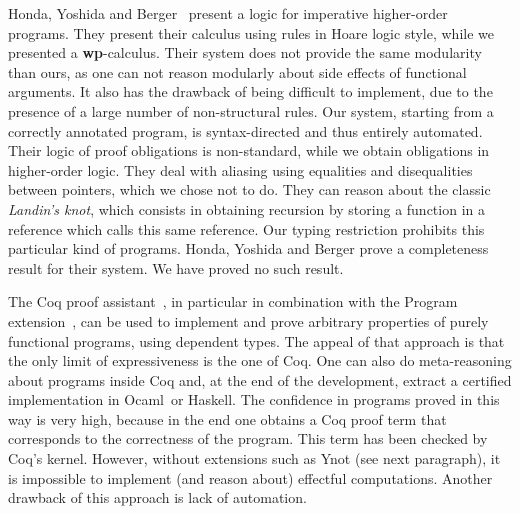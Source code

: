 \documentclass[a4paper]{llncs}
\newcommand{\wpre}{{\bf wp}}
\newcommand{\ocaml}{Ocaml}
\begin{document}
Honda, Yoshida and
Berger~\cite{Honda05anobservationally,BergerHondaYoshida05aliasing} present a
logic for imperative higher-order programs. They present their calculus using
rules in Hoare logic style, while we presented a \wpre-calculus. Their system
does not provide the same modularity than ours, as one can not reason
modularly about side effects of functional arguments. It also has the drawback
of being difficult to implement, due to the presence of a large number of
non-structural rules. Our system, starting from a correctly annotated program,
is syntax-directed and thus entirely automated. Their logic of proof
obligations is non-standard, while we obtain obligations in higher-order
logic. They deal with aliasing using equalities and disequalities between
pointers, which we chose not to do. They can reason about the classic {\em
Landin's knot}, which consists in obtaining recursion by storing a function in
a reference which calls this same reference. Our typing restriction prohibits
this particular kind of programs.  Honda, Yoshida and Berger prove a
completeness result for their system. We have proved no such result.


The Coq proof assistant~\cite{CoqManualV81}, in particular in combination with
the Program extension~\cite{sozeau07icfp}, can be used to implement and prove
arbitrary properties of purely functional programs, using dependent types. The
appeal of that approach is that the only limit of expressiveness is the one of
Coq. One can also do meta-reasoning about programs inside Coq and, at the end
of the development, extract a certified implementation in \ocaml\ or Haskell.
The confidence in programs proved in this way is very high, because in the end
one obtains a Coq proof term that corresponds to the correctness of the
program. This term has been checked by Coq's kernel. However, without
extensions such as Ynot (see next paragraph), it is impossible to implement
(and reason about) effectful computations. Another drawback of this approach
is lack of automation.
\end{document}
